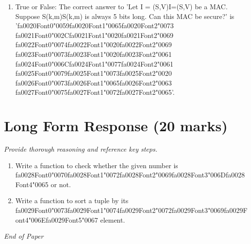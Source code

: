 \documentclass[12pt]{article}
\begin{document}
\begin{enumerate}[label=\arabic*.]
\item True or False: The correct answer to 'Let I = (S,V)I=(S,V) be a MAC. Suppose S(k,m)S(k,m) is always 5 bits long. Can this MAC be secure?' is '{\csname fa0020Font0\endcsname\char"0059}{\csname fa0020Font1\endcsname\char"0065}{\csname fa0020Font2\endcsname\char"0073} {\csname fa0021Font0\endcsname\char"002C}{\csname fa0021Font1\endcsname\char"0020}{\csname fa0021Font2\endcsname\char"0069} {\csname fa0022Font0\endcsname\char"0074}{\csname fa0022Font1\endcsname\char"0020}{\csname fa0022Font2\endcsname\char"0069} {\csname fa0023Font0\endcsname\char"0073}{\csname fa0023Font1\endcsname\char"0020}{\csname fa0023Font2\endcsname\char"0061} {\csname fa0024Font0\endcsname\char"006C}{\csname fa0024Font1\endcsname\char"0077}{\csname fa0024Font2\endcsname\char"0061} {\csname fa0025Font0\endcsname\char"0079}{\csname fa0025Font1\endcsname\char"0073}{\csname fa0025Font2\endcsname\char"0020} {\csname fa0026Font0\endcsname\char"0073}{\csname fa0026Font1\endcsname\char"0065}{\csname fa0026Font2\endcsname\char"0063} {\csname fa0027Font0\endcsname\char"0075}{\csname fa0027Font1\endcsname\char"0072}{\csname fa0027Font2\endcsname\char"0065}'.
\end{enumerate}

\section*{Long Form Response (20 marks)}
\textit{Provide thorough reasoning and reference key steps.}
\begin{enumerate}[label=\arabic*.]
\item Write a function to check whether the given number is {\csname fa0028Font0\endcsname\char"0070}{\csname fa0028Font1\endcsname\char"0072}{\csname fa0028Font2\endcsname\char"0069}{\csname fa0028Font3\endcsname\char"006D}{\csname fa0028Font4\endcsname\char"0065} or not.
\item Write a function to sort a tuple by its {\csname fa0029Font0\endcsname\char"0073}{\csname fa0029Font1\endcsname\char"0074}{\csname fa0029Font2\endcsname\char"0072}{\csname fa0029Font3\endcsname\char"0069}{\csname fa0029Font4\endcsname\char"006E}{\csname fa0029Font5\endcsname\char"0067} element.
\end{enumerate}

\vfill
\noindent\textit{End of Paper}
\end{document}
